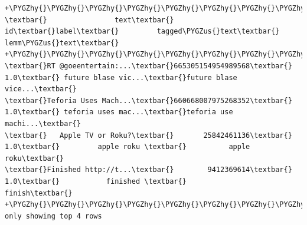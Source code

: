 \documentclass[letterpaper,11pt,english]{sphinxmanual}
\def\PYGZus{\char`\_}
\def\PYGZhy{\char`\-}
\begin{document}
\begin{Verbatim}[commandchars=\\\{\}]
+\PYGZhy{}\PYGZhy{}\PYGZhy{}\PYGZhy{}\PYGZhy{}\PYGZhy{}\PYGZhy{}\PYGZhy{}\PYGZhy{}\PYGZhy{}\PYGZhy{}\PYGZhy{}\PYGZhy{}\PYGZhy{}\PYGZhy{}\PYGZhy{}\PYGZhy{}\PYGZhy{}\PYGZhy{}\PYGZhy{}+\PYGZhy{}\PYGZhy{}\PYGZhy{}\PYGZhy{}\PYGZhy{}\PYGZhy{}\PYGZhy{}\PYGZhy{}\PYGZhy{}\PYGZhy{}\PYGZhy{}\PYGZhy{}\PYGZhy{}\PYGZhy{}\PYGZhy{}\PYGZhy{}\PYGZhy{}\PYGZhy{}+\PYGZhy{}\PYGZhy{}\PYGZhy{}\PYGZhy{}\PYGZhy{}+\PYGZhy{}\PYGZhy{}\PYGZhy{}\PYGZhy{}\PYGZhy{}\PYGZhy{}\PYGZhy{}\PYGZhy{}\PYGZhy{}\PYGZhy{}\PYGZhy{}\PYGZhy{}\PYGZhy{}\PYGZhy{}\PYGZhy{}\PYGZhy{}\PYGZhy{}\PYGZhy{}\PYGZhy{}\PYGZhy{}+\PYGZhy{}\PYGZhy{}\PYGZhy{}\PYGZhy{}\PYGZhy{}\PYGZhy{}\PYGZhy{}\PYGZhy{}\PYGZhy{}\PYGZhy{}\PYGZhy{}\PYGZhy{}\PYGZhy{}\PYGZhy{}\PYGZhy{}\PYGZhy{}\PYGZhy{}\PYGZhy{}\PYGZhy{}\PYGZhy{}+
\textbar{}                text\textbar{}                id\textbar{}label\textbar{}         tagged\PYGZus{}text\textbar{}           lemm\PYGZus{}text\textbar{}
+\PYGZhy{}\PYGZhy{}\PYGZhy{}\PYGZhy{}\PYGZhy{}\PYGZhy{}\PYGZhy{}\PYGZhy{}\PYGZhy{}\PYGZhy{}\PYGZhy{}\PYGZhy{}\PYGZhy{}\PYGZhy{}\PYGZhy{}\PYGZhy{}\PYGZhy{}\PYGZhy{}\PYGZhy{}\PYGZhy{}+\PYGZhy{}\PYGZhy{}\PYGZhy{}\PYGZhy{}\PYGZhy{}\PYGZhy{}\PYGZhy{}\PYGZhy{}\PYGZhy{}\PYGZhy{}\PYGZhy{}\PYGZhy{}\PYGZhy{}\PYGZhy{}\PYGZhy{}\PYGZhy{}\PYGZhy{}\PYGZhy{}+\PYGZhy{}\PYGZhy{}\PYGZhy{}\PYGZhy{}\PYGZhy{}+\PYGZhy{}\PYGZhy{}\PYGZhy{}\PYGZhy{}\PYGZhy{}\PYGZhy{}\PYGZhy{}\PYGZhy{}\PYGZhy{}\PYGZhy{}\PYGZhy{}\PYGZhy{}\PYGZhy{}\PYGZhy{}\PYGZhy{}\PYGZhy{}\PYGZhy{}\PYGZhy{}\PYGZhy{}\PYGZhy{}+\PYGZhy{}\PYGZhy{}\PYGZhy{}\PYGZhy{}\PYGZhy{}\PYGZhy{}\PYGZhy{}\PYGZhy{}\PYGZhy{}\PYGZhy{}\PYGZhy{}\PYGZhy{}\PYGZhy{}\PYGZhy{}\PYGZhy{}\PYGZhy{}\PYGZhy{}\PYGZhy{}\PYGZhy{}\PYGZhy{}+
\textbar{}RT @goeentertain:...\textbar{}665305154954989568\textbar{}  1.0\textbar{} future blase vic...\textbar{}future blase vice...\textbar{}
\textbar{}Teforia Uses Mach...\textbar{}660668007975268352\textbar{}  1.0\textbar{} teforia uses mac...\textbar{}teforia use machi...\textbar{}
\textbar{}   Apple TV or Roku?\textbar{}       25842461136\textbar{}  1.0\textbar{}         apple roku \textbar{}          apple roku\textbar{}
\textbar{}Finished http://t...\textbar{}        9412369614\textbar{}  1.0\textbar{}           finished \textbar{}              finish\textbar{}
+\PYGZhy{}\PYGZhy{}\PYGZhy{}\PYGZhy{}\PYGZhy{}\PYGZhy{}\PYGZhy{}\PYGZhy{}\PYGZhy{}\PYGZhy{}\PYGZhy{}\PYGZhy{}\PYGZhy{}\PYGZhy{}\PYGZhy{}\PYGZhy{}\PYGZhy{}\PYGZhy{}\PYGZhy{}\PYGZhy{}+\PYGZhy{}\PYGZhy{}\PYGZhy{}\PYGZhy{}\PYGZhy{}\PYGZhy{}\PYGZhy{}\PYGZhy{}\PYGZhy{}\PYGZhy{}\PYGZhy{}\PYGZhy{}\PYGZhy{}\PYGZhy{}\PYGZhy{}\PYGZhy{}\PYGZhy{}\PYGZhy{}+\PYGZhy{}\PYGZhy{}\PYGZhy{}\PYGZhy{}\PYGZhy{}+\PYGZhy{}\PYGZhy{}\PYGZhy{}\PYGZhy{}\PYGZhy{}\PYGZhy{}\PYGZhy{}\PYGZhy{}\PYGZhy{}\PYGZhy{}\PYGZhy{}\PYGZhy{}\PYGZhy{}\PYGZhy{}\PYGZhy{}\PYGZhy{}\PYGZhy{}\PYGZhy{}\PYGZhy{}\PYGZhy{}+\PYGZhy{}\PYGZhy{}\PYGZhy{}\PYGZhy{}\PYGZhy{}\PYGZhy{}\PYGZhy{}\PYGZhy{}\PYGZhy{}\PYGZhy{}\PYGZhy{}\PYGZhy{}\PYGZhy{}\PYGZhy{}\PYGZhy{}\PYGZhy{}\PYGZhy{}\PYGZhy{}\PYGZhy{}\PYGZhy{}+
only showing top 4 rows
\end{Verbatim}
\end{document}
